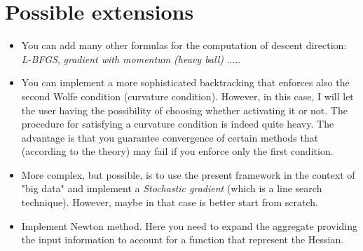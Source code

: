 \documentclass{article}
\begin{document}
\section{Possible extensions}
\begin{itemize}
    \item You can add many other formulas for the computation of descent direction: \emph{L-BFGS}, \emph{gradient with momentum (heavy ball)} ..... 
    \item You can implement a more sophisticated backtracking that enforces also the second Wolfe condition (curvature condition). However, in this case, I will let the user having the possibility of choosing whether activating it or not. The procedure for satisfying a curvature condition is indeed
    quite heavy. The advantage is that you guarantee convergence of certain methods that (according to the theory) may fail if you enforce only the first condition.
    \item More complex, but possible, is to use the present framework in the context of "big data" and implement a \emph{Stochastic gradient} (which is a line search technique). However, maybe in that case is better start from scratch. 
    \item Implement Newton method. Here you need to expand the aggregate providing the input information to account for a function that represent the Hessian. 
\end{itemize}

 

  
\end{document}
